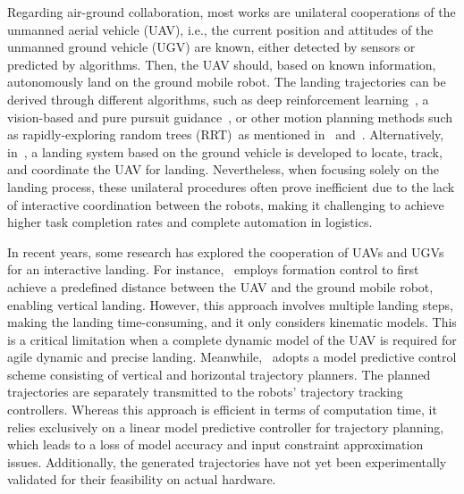 \documentclass[conference,preprint]{IEEEtran}
\begin{document}
Regarding air-ground collaboration, most works are unilateral cooperations of the unmanned aerial vehicle (UAV), i.e., the current position and attitudes of the unmanned ground vehicle (UGV) are known, either detected by sensors or predicted by algorithms. Then, the UAV should, based on known information, autonomously land on the ground mobile robot. The landing trajectories can be derived through different algorithms, such as deep reinforcement learning~\cite{RodriguezRamos2018}, a vision-based and pure pursuit guidance~\cite{Gautam2022}, or other motion planning methods such as rapidly-exploring random trees (RRT)~as mentioned in~\cite{Nurimbetov2017} and~\cite{Sinnemann2022}.
Alternatively, in~\cite{Si2024}, a landing system based on the ground vehicle is developed to locate, track, and coordinate the UAV for landing. Nevertheless, when focusing solely on the landing process, these unilateral procedures often prove inefficient due to the lack of interactive coordination between the robots, making it challenging to achieve higher task completion rates and complete automation in logistics. 

In recent years, some research has explored the cooperation of UAVs and UGVs for an interactive landing. For instance,~\cite{Rabelo2021} employs formation control to first achieve a predefined distance between the UAV and the ground mobile robot, enabling vertical landing. However, this approach involves multiple landing steps, making the landing time-consuming, and it only considers kinematic models. This is a critical limitation when a complete dynamic model of the UAV is required for agile dynamic and precise landing. Meanwhile,~\cite{Hebisch2021} adopts a model predictive control scheme consisting of vertical and horizontal trajectory planners. The planned trajectories are separately transmitted to the robots' trajectory tracking controllers. 
Whereas this approach is efficient in terms of computation time, it relies exclusively on a linear model predictive controller for trajectory planning, which leads to a loss of model accuracy and input constraint approximation issues. 
Additionally, the generated trajectories have not yet been experimentally validated for their feasibility on actual hardware.
\end{document}
